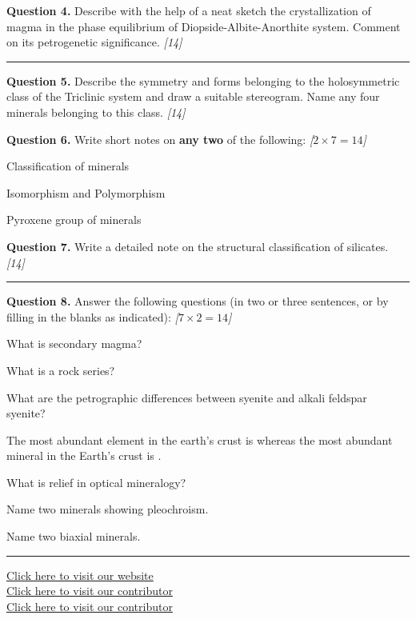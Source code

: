 \documentclass[11pt,a4paper]{article}
\newcommand{\pts}[1]{\hfill   \textit{[#1]}}
\begin{document}
\medskip


\noindent   \textbf{Question 4.} Describe with the help of a neat sketch the crystallization of magma in the phase equilibrium of Diopside-Albite-Anorthite system. Comment on its petrogenetic significance. \pts{14}

\bigskip


\rule{\linewidth}{0.4pt}\smallskip




\noindent   \textbf{Question 5.} Describe the symmetry and forms belonging to the holosymmetric class of the Triclinic system and draw a suitable stereogram. Name any four minerals belonging to this class. \pts{14}

\medskip


\noindent   \textbf{Question 6.} Write short notes on   \textbf{any two} of the following: \pts{$2  \times 7 = 14$}

\begin{romanparts}
  \item Classification of minerals
  \item Isomorphism and Polymorphism
  \item Pyroxene group of minerals
\end{romanparts}

\medskip


\noindent   \textbf{Question 7.} Write a detailed note on the structural classification of silicates. \pts{14}

\bigskip


\rule{\linewidth}{0.4pt}\smallskip




\noindent   \textbf{Question 8.} Answer the following questions (in two or three sentences, or by filling in the blanks as indicated): \pts{$7  \times 2 = 14$}

\begin{romanparts}
  \item What is secondary magma?
  \item What is a rock series?
  \item What are the petrographic differences between syenite and alkali feldspar syenite?
  \item The most abundant element in the earth's crust is \underline{\hspace{3cm}} whereas the most abundant mineral in the Earth's crust is \underline{\hspace{3cm}}.
  \item What is relief in optical mineralogy?
  \item Name two minerals showing pleochroism.
  \item Name two biaxial minerals.
\end{romanparts}

\vfill\rule{\linewidth}{0.4pt}

\begin{center}\small
\href{https://bhu-exam.vercel.app/}{Click here to visit our website}\\[4pt]
\href{https://me-aryan.vercel.app/}{Click here to visit our contributor}\\[4pt]
\href{https://quashan-me.vercel.app/}{Click here to visit our contributor}
\end{center}
\end{document}

